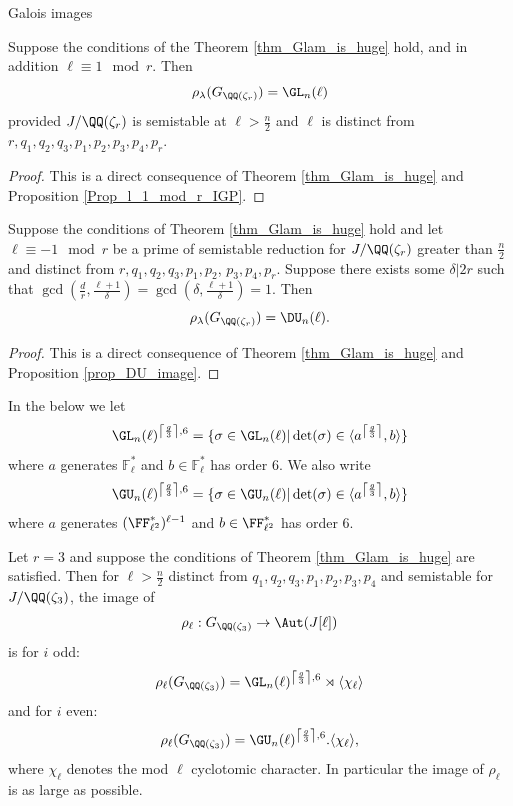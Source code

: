 \documentclass[11pt,a4paper]{article}
\newcommand{\Fl}{\mathbb{F}_\ell}
\newcommand{\Qr}{{\QQ(\zeta_r)}}
\newcommand{\Gcyclo}[1]{G_{\QQ(\zeta_{#1})}}
\newcommand{\GQr}{G_{\QQ(\zeta_{r})}}
\begin{document}
\begin{section}{Galois images}
\begin{theorem}
\label{thm_l_equiv_1_mod_r_image_of_mod_lambda}
Suppose the conditions of the Theorem \ref{thm_Glam_is_huge} hold, and in addition $\ell \equiv 1 \mod{r}$. Then \[\rho_\lambda(\GQr) = \GL_n(\ell)\]
provided $J/\Qr$ is semistable at $\ell>\frac{n}{2}$  and $\ell$ is distinct from $r,q_1,q_2,q_3,p_1,p_2,p_3,p_4,p_r$.
\end{theorem}

\begin{proof}
This is a direct consequence of Theorem \ref{thm_Glam_is_huge} and Proposition \ref{Prop_l_1_mod_r_IGP}.
\end{proof}

\begin{theorem}
\label{thm_DU_image_r=-1}
Suppose the conditions of Theorem \ref{thm_Glam_is_huge} hold and let $\ell \equiv -1 \mod{r}$ be a prime of semistable reduction for $J/\Qr$ greater than $\frac{n}{2}$ and distinct from $ r,q_1,q_2,q_3,p_1,p_2$, $p_3,p_4,p_r$.
Suppose there exists some $\delta|2r$ such that $\gcd(\frac{d}{r},\frac{\ell+1}{\delta})= \gcd(\delta, \frac{\ell+1}{\delta})=1$.
Then \[\rho_\lambda(\GQr) = \DU_n(\ell).\]
\end{theorem}

\begin{proof}
This is a direct consequence of Theorem \ref{thm_Glam_is_huge} and Proposition \ref{prop_DU_image}.
\end{proof}

In the below we let \[\GL_n(\ell)^{\left\lceil \frac{g}{3} \right\rceil, 6} = \{\sigma \in \GL_n(\ell)| \det(\sigma) \in \langle a^{\left\lceil \frac{g}{3} \right\rceil},b\rangle \}\] where $a$ generates $\Fl^*$ and $b \in \Fl^*$ has order $6$. We also write \[\GU_n(\ell)^{\left\lceil \frac{g}{3} \right\rceil, 6} =
\{ \sigma \in \GU_n(\ell)| \det(\sigma) \in \langle a^{\left\lceil \frac{g}{3} \right\rceil},b\rangle \}\] where $a$ generates $(\FF_{\ell^2}^*)^{\ell-1}$ and $b \in \FF_{\ell^2}^*$ has order $6$.

\begin{theorem}
\label{thm_r=3_exact_image_surjective}
Let $r=3$ and suppose the conditions of Theorem \ref{thm_Glam_is_huge} are satisfied.
Then for $\ell>\frac{n}{2}$ distinct from $q_1,q_2,q_3,p_1,p_2,p_3,p_4$ and semistable for $J/\QQ(\zeta_3)$, the image of  \[\rho_\ell:\Gcyclo{3} \rightarrow \Aut(J[\ell])\] is for $i$ odd:
\[\rho_\ell(\Gcyclo{3}) = \GL_n(\ell)^{\left\lceil \frac{g}{3} \right\rceil, 6} \rtimes \langle \chi_\ell\rangle\]
and for $i$ even:
\[\rho_\ell(\Gcyclo{3}) = \GU_n(\ell)^{\left\lceil \frac{g}{3} \right\rceil, 6} . \langle \chi_\ell\rangle,\]
where $\chi_\ell$ denotes the mod $\ell$ cyclotomic character.
In particular the image of $\rho_\ell$ is as large as possible.
\end{theorem}


\end{section}
\end{document}
